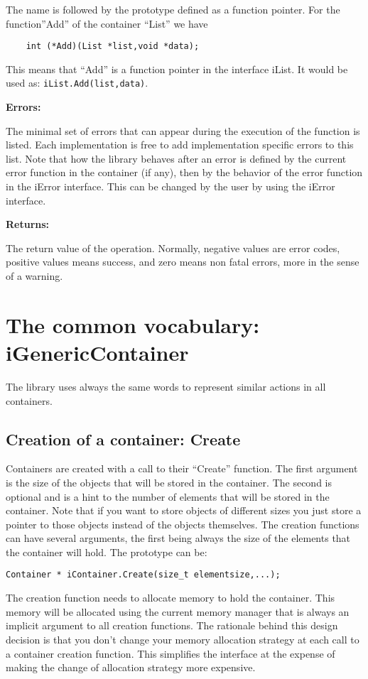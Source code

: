 \documentclass[12pt,a4paper]{memoir} %
\newcommand{\apierrors}{%
\par \noindent \textbf{Errors:}\par\noindent
}
\newcommand{\returns}{%
\par\noindent \textbf{Returns:} %
}
\begin{document}
\noindent The name is followed by the prototype defined as a function pointer. For the function”Add” of the container “List” we have
\begin{verbatim}
    int (*Add)(List *list,void *data);
\end{verbatim} 
This means that “Add” is a function pointer in the interface iList. It would be used as:
\texttt{iList.Add(list,data)}.
\apierrors
The minimal set of errors that can appear during the execution of the function is listed. Each implementation is free to add implementation specific errors to this list. Note that how the library behaves after an error is defined by the current error function in the container (if any), then by the behavior of the error function in the iError interface. This can be changed by the user by using the iError interface.
\returns
The return value of the operation. Normally, negative values are error codes, positive values means success, and zero means non fatal errors, more in the sense of a warning.
\chapter{The common vocabulary: iGenericContainer}
The library uses always the same words to represent similar actions in all containers. 
\section{Creation of a container: Create}
Containers are created with a call to their “Create” function.  The first argument is the size of the objects that will be stored in the container. The second is optional and is a hint to the number of elements that will be stored in the container.
Note that if you want to store objects of different sizes you just store a pointer to those objects instead of the objects themselves.
The creation functions can have several arguments, the first being always the size of the elements that the container will hold. The prototype can be:
\begin{verbatim}
Container * iContainer.Create(size_t elementsize,...);
\end{verbatim}
The creation function needs to allocate memory to hold the container. This memory will be allocated using the current memory manager that is always an implicit argument to all creation functions. The rationale behind this design decision is that you don't change your memory allocation strategy at each call to a container creation function. This simplifies the interface at the expense of making the change of allocation strategy more expensive.
\end{document}
